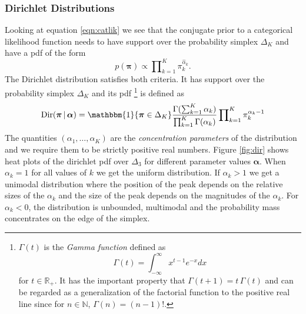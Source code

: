 \documentclass[final,3p,times,twocolumn]{elsarticle}
\DeclareMathOperator*{\Dir}{Dir}
\let\bs\boldsymbol
\begin{document}
\subsubsection*{\normalfont \small \bfseries Dirichlet Distributions}
Looking at equation \ref{eqn:catlik} we see that the conjugate prior to a categorical likelihood function needs to have support over the probability simplex $\Delta_K$ and have a pdf of the form 
\begin{equation}
p(\bs \pi) \propto \prod\nolimits_{k=1}^K \pi_k^{\hat\alpha_k}.
\end{equation}
The Dirichlet distribution satisfies both criteria. 
It has support over the probability simplex $\Delta_K$ and its pdf
\footnote{
$\Gamma(t)$ is the \emph{Gamma function} defined as 
\[
\Gamma(t) = \int\nolimits_{-\infty}^{\infty} x^{t-1} e^{-x} dx
\]	
for $t \in \mathbb{R}_+$.
It has the important property that $\Gamma(t+1) = t\,\Gamma(t)$ and can be regarded as a generalization of the factorial function to the positive real line since for $n\in \mathbb{N}$, $\Gamma(n) = (n-1)!$.
}
is defined as
\begin{equation}
\label{eqn:dirpdf}
\Dir(\bs \pi\,|\,\bs \alpha) = \mathbbm{1}\{\bs \pi \in \Delta_K\}\frac{\Gamma(\sum_{k=1}^K\alpha_k)}{\prod_{k=1}^K\Gamma(\alpha_k)}\prod\nolimits_{k=1}^K\pi_k^{\alpha_k - 1} 
\end{equation}
The quantities $(\alpha_1,\dots,\alpha_K)$ are the \emph{concentration parameters} of the distribution and we require them to be strictly positive real numbers. 
Figure \ref{fig:dir} shows heat plots of the dirichlet pdf over $\Delta_3$ for different parameter values $\bs \alpha$.
When $\alpha_k = 1$ for all values of $k$ we get the uniform distribution.
If $\alpha_k  > 1$ we get a unimodal distribution where the position of the peak depends on the relative sizes of the $\alpha_k$ and the size of the peak depends on the magnitudes of the $\alpha_k$.
For $\alpha_k < 0$, the distribution is unbounded, multimodal and the probability mass concentrates on the edge of the simplex.
\end{document}
